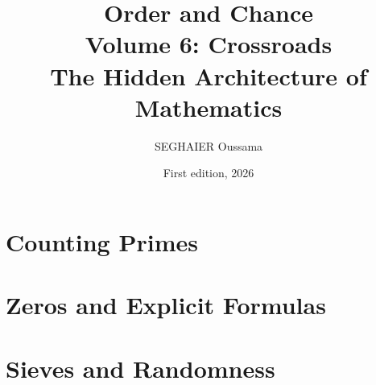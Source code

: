 \documentclass[11pt,openany]{book}
\title{\Huge\textbf{Order and Chance}\\[0.4em]\LARGE Volume 6: Crossroads\\[0.6em]
\Large The Hidden Architecture of Mathematics}
\author{SEGHAIER Oussama}
\date{First edition, 2026}
\begin{document}
\frontmatter
\makecover
\maketitle

\tableofcontents

\mainmatter

\part{Counting Primes}





\part{Zeros and Explicit Formulas}


\part{Sieves and Randomness}






\backmatter



\end{document}
